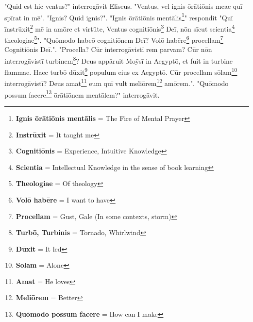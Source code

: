"Quid est hic ventus?" interrogāvit Eliseus. "Ventus, vel ignis ōrātiōnis meae quī spīrat in mē". "Ignis? Quid ignis?". "Ignis ōrātiōnis mentālis\footnote{\textbf{Ignis ōrātiōnis mentālis} = The Fire of Mental Prayer}" respondit "Quī īnstrūxit\footnote{\textbf{Instrūxit} = It taught me} mē in amōre et virtūte, Ventus cognitiōnis\footnote{\textbf{Cognitiōnis} = Experience, Intuitive Knowledge} Deī, nōn sīcut scientia\footnote{\textbf{Scientia} = Intellectual Knowledge in the sense of book learning} theologiae\footnote{\textbf{Theologiae} = Of theology}". "Quōmodo habeō cognitiōnem Deī? Volō habēre\footnote{\textbf{Volō habēre} = I want to have} procellam\footnote{\textbf{Procellam} = Gust, Gale (In some contexts, storm) } Cognitiōnis Deī.". "Procella? Cūr interrogāvistī rem parvam? Cūr nōn interrogāvistī turbinem\footnote{\textbf{Turbō, Turbinis} = Tornado, Whirlwind}? Deus appāruit Moȳsī in Aegyptō, et fuit in turbine flammae. Haec turbō dūxit\footnote{\textbf{Dūxit} = It led} populum eius ex Aegyptō. Cūr procellam sōlam\footnote{\textbf{Sōlam} = Alone} interrogāvistī? Deus amat\footnote{\textbf{Amat} = He loves} eum quī vult meliōrem\footnote{\textbf{Meliōrem} = Better} amōrem.". "Quōmodo possum facere\footnote{\textbf{Quōmodo possum facere} = How can I make} ōrātiōnem mentālem?" interrogāvit. 

